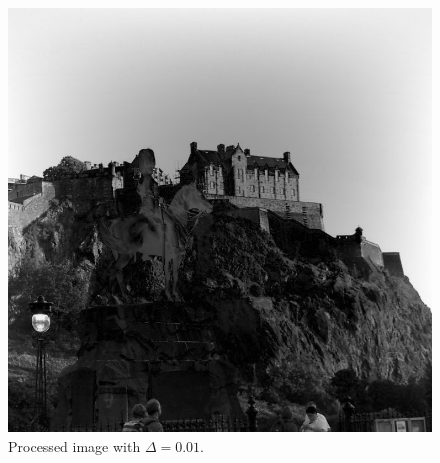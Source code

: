 \documentclass[11pt]{article}
\begin{document}
	\begin{figure}[H]	
		\centering
		\includegraphics[scale=0.23]{edge768x768_010.jpg}
		\caption{Processed image with $\Delta=0.01$.}\label{pic1}
	\end{figure}

	\pagebreak
	
\end{document}
